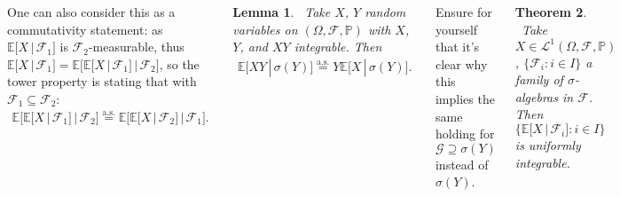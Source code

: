 \documentclass{tikzposter} %
\newtheorem{theorem}{Theorem}
\newtheorem{lemma}[theorem]{Lemma}
\begin{document}
\begin{columns}
{    One can also consider this as a commutativity statement: as $\mathbb{E}\big[X \,|\, \mathcal{F}_{1}\big]$ is $\mathcal{F}_{2}$-measurable, thus $\mathbb{E}\big[X \,|\, \mathcal{F}_{1}\big] = \mathbb{E}\big[\mathbb{E}[X \,|\, \mathcal{F}_{1}] \,|\, \mathcal{F}_{2}\big]$, so the tower property is stating that with $\mathcal{F}_{1} \subseteq \mathcal{F}_{2}$:
    \begin{align*}
      \mathbb{E}\Big[\mathbb{E}\big[X \,|\, \mathcal{F}_{1}\big] \,|\, \mathcal{F}_{2}\Big] \overset{\mathrm{a.s.}}{=} \mathbb{E}\Big[\mathbb{E}\big[X \,|\, \mathcal{F}_{2}\big] \,|\, \mathcal{F}_{1}\Big].
    \end{align*}

    \begin{lemma}
    \ Take $X$, $Y$ random variables on $(\Omega, \mathcal{F}, \mathbb{P})$ with $X$, $Y$, and $XY$ integrable. Then
    \begin{align*}
      \mathbb{E}\big[XY \,|\, \sigma(Y)\big] \overset{\mathrm{a.s.}}{=} Y\mathbb{E}\big[X \,|\, \sigma(Y)\big].
    \end{align*}
    \end{lemma}
    Ensure for yourself that it's clear why this implies the same holding for $\mathcal{G} \supseteq \sigma(Y)$ instead of $\sigma(Y)$. \\

    \begin{theorem}
    \ Take $X \in \mathcal{L}^{1}(\Omega, \mathcal{F}, \mathbb{P})$, $\{\mathcal{F}_{i} : i \in I\}$ a family of $\sigma$-algebras in $\mathcal{F}$. Then $\big\{\mathbb{E}\big[X \,|\, \mathcal{F}_{i}\big] : i \in I\big\}$ is uniformly integrable.
    \end{theorem}
    \hphantom{}

}
\end{columns}
\end{document}
